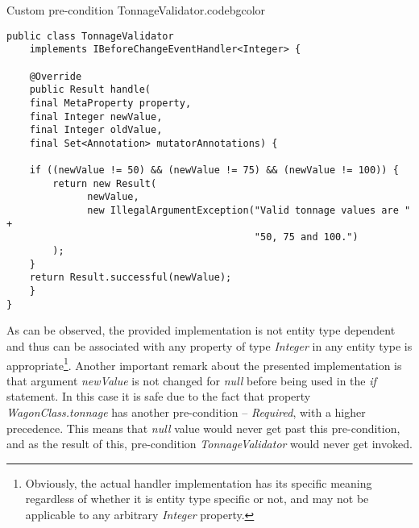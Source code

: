   \begin{code}{Custom pre-condition TonnageValidator.}{\label{lst:TonnageValidator}}{codebgcolor}
    \begin{lstlisting}
public class TonnageValidator 
    implements IBeforeChangeEventHandler<Integer> {

    @Override
    public Result handle(
	final MetaProperty property, 
	final Integer newValue, 
	final Integer oldValue, 
	final Set<Annotation> mutatorAnnotations) {
	
	if ((newValue != 50) && (newValue != 75) && (newValue != 100)) {
	    return new Result(
		      newValue, 
		      new IllegalArgumentException("Valid tonnage values are " +
	    		                           "50, 75 and 100.")
	    );
	}
	return Result.successful(newValue);
    }
}
    \end{lstlisting}
  \end{code}

  As can be observed, the provided implementation is not entity type dependent and thus can be associated with any property of type \emph{Integer} in any entity type is appropriate\footnote{Obviously, the actual handler implementation has its specific meaning regardless of whether it is entity type specific or not, and may not be applicable to any arbitrary \emph{Integer} property.}.
  Another important remark about the presented implementation is that argument \emph{newValue} is not changed for \emph{null} before being used in the \emph{if} statement.
  In this case it is safe due to the fact that property \emph{WagonClass.tonnage} has another pre-condition -- \emph{Required}, with a higher precedence.
  This means that \emph{null} value would never get past this pre-condition, and as the result of this, pre-condition \emph{TonnageValidator} would never get invoked.

